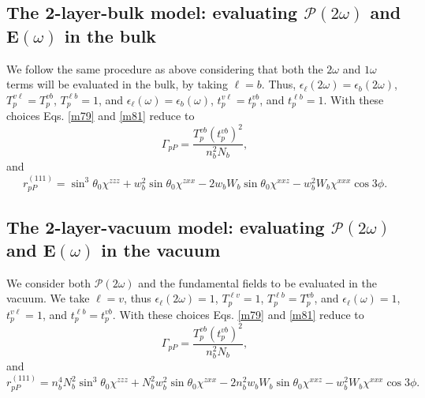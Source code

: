 
\subsection{The 2-layer-bulk model: evaluating
\texorpdfstring{$\boldsymbol{\mathcal{P}}(2\omega)$}{P(2w)} and
\texorpdfstring{$\mathbf{E}(\omega)$}{E(w)} in the bulk}\label{sec:2-layer-bulk}

We follow the same procedure as above considering that both the $2\omega$ and
$1\omega$ terms will be evaluated in the bulk, by taking $\ell = b$. Thus,
$\epsilon_{\ell}(2\omega) = \epsilon_{b}(2\omega)$, $T^{v\ell}_{p} =
T^{vb}_{p}$, $T^{\ell b}_{p} = 1$, and $\epsilon_{\ell}(\omega) =
\epsilon_{b}(\omega)$, $t^{v\ell}_{p} = t^{vb}_{p}$, and $t^{\ell b}_{p} = 1$.
With these choices Eqs. \eqref{m79} and \eqref{m81} reduce to
\begin{equation}
\Gamma_{pP} =
\frac{T_{p}^{vb}\left(t^{vb}_{p}\right)^{2}}{n^{2}_{b}N_{b}}, 
\end{equation}
and
\begin{equation}
r^{(111)}_{pP} = 
\sin^{3}\theta_{0}\chi^{zzz} + w^{2}_{b}\sin\theta_{0}\chi^{zxx} 
 - 2w_{b}W_{b}\sin\theta_{0}\chi^{xxz} - w^{2}_{b}W_{b}\chi^{xxx}\cos3\phi.
\end{equation}



\subsection{The 2-layer-vacuum model: evaluating
\texorpdfstring{$\boldsymbol{\mathcal{P}}(2\omega)$}{P(2w)} and
\texorpdfstring{$\mathbf{E}(\omega)$}{E(w)} in the vacuum}
\label{sec:2-layer-vacuum}

We consider both $\boldsymbol{\mathcal{P}}(2\omega)$ and the fundamental fields
to be evaluated in the vacuum. We take $\ell = v$, thus
$\epsilon_{\ell}(2\omega) = 1$, $T^{\ell v}_{p} = 1$, $T^{\ell b}_{p} =
T^{vb}_{p}$, and $\epsilon_{\ell}(\omega) = 1$, $t^{v\ell}_{p} = 1$, and
$t^{\ell b}_{p} = t^{vb}_{p}$. With these choices Eqs. \eqref{m79} and
\eqref{m81} reduce to
\begin{equation}
\Gamma_{pP} =
\frac{T^{v b}_{p}\left(t^{v b}_{p}\right)^{2}}{n^{2}_{b}N_{b}},
\end{equation}
and
\begin{equation}
r^{(111)}_{pP} =
  n^{4}_{b}N^{2}_{b}\sin^{3}\theta_{0}\chi^{zzz}
+ N^{2}_{b}w^{2}_{b}\sin\theta_{0}\chi^{zxx}
- 2n^{2}_{b}w_{b}W_{b}\sin\theta_{0}\chi^{xxz}
- w^{2}_{b}W_{b}\chi^{xxx}\cos3\phi.
\end{equation}


